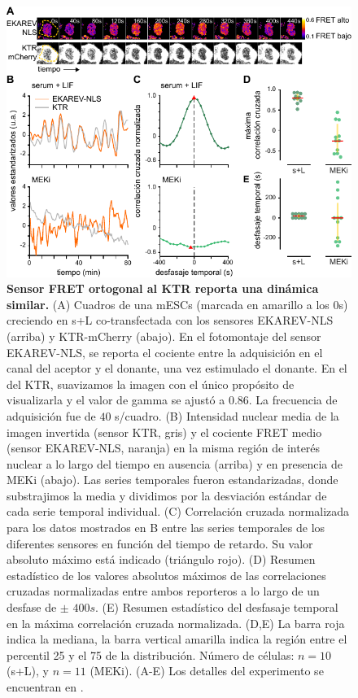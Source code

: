 \documentclass[./main.tex]{subfiles}
\begin{document}
\begin{figure}
    \centering
    \includegraphics[width=1\columnwidth]{figures/chapter2/C2_FRET.pdf} 
    \caption{\textbf{Sensor FRET ortogonal al KTR reporta una dinámica similar.} (A) Cuadros de una mESCs (marcada en amarillo a los 0s) creciendo en s+L co-transfectada con los sensores EKAREV-NLS (arriba) y KTR-mCherry (abajo). En el fotomontaje del sensor EKAREV-NLS, se reporta el cociente entre la adquisición en el canal del aceptor y el donante, una vez estimulado el donante. En el del KTR, suavizamos la imagen con el único propósito de visualizarla y el valor de gamma se ajustó a $0.86$. La frecuencia de adquisición fue de $40$ s/cuadro. (B) Intensidad nuclear media de la imagen invertida (sensor KTR, gris) y el cociente FRET medio (sensor EKAREV-NLS, naranja) en la misma región de interés nuclear a lo largo del tiempo en ausencia (arriba) y en presencia de MEKi (abajo). Las series temporales fueron estandarizadas, donde substrajimos la media y dividimos por la desviación estándar de cada serie temporal individual. (C) Correlación cruzada normalizada para los datos mostrados en B entre las series temporales de los diferentes sensores en función del tiempo de retardo. Su valor absoluto máximo está indicado (triángulo rojo). (D) Resumen estadístico de los valores absolutos máximos de las correlaciones cruzadas normalizadas entre ambos reporteros a lo largo de un desfase de $\pm$ $400 s$. (E) Resumen estadístico del desfasaje temporal en la máxima correlación cruzada normalizada. (D,E) La barra roja indica la mediana, la barra vertical amarilla indica la región entre el percentil 25 y el 75 de la distribución. Número de células: $n = 10$ (s+L), y $n = 11$ (MEKi). (A-E) Los detalles del experimento se encuentran en \cite{Fabris2022}.}
    \label{C2_fig:FRET}
\end{figure}
\end{document}
